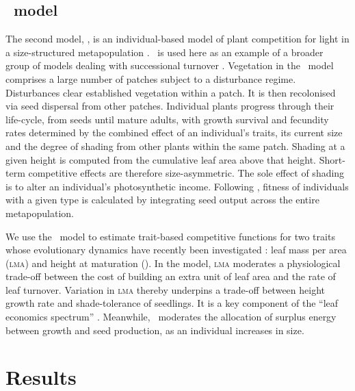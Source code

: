 \documentclass[a4paper,11pt]{article}
\begin{document}
\subsection{\plant\ model}

The second model, \plant, is an individual-based model of plant competition
for light in a size-structured metapopulation \citep{Falster-2016,Falster-2015}. \plant\ is used here as an example of a broader group
of models dealing with successional turnover
\citep{Huston-1987,Kohyama-1993,Moorcroft-2001,Falster-2011}.
%
Vegetation in the \plant\ model comprises a large number of patches subject
to a disturbance regime.  Disturbances clear established
vegetation within a patch. It is then recolonised via seed
dispersal from other patches.  Individual plants progress through
their life-cycle, from seeds until mature adults, with growth survival
and fecundity rates determined by the combined effect of an
individual's traits, its current size and the degree of shading from
other plants within the same patch. Shading at a given
height is computed from the cumulative leaf area above that height.
Short-term competitive effects are therefore size-asymmetric. The sole
effect of shading is to alter an individual's photosynthetic
income. Following \citep{Falster-2015}, fitness of individuals
with a given type is calculated by integrating seed output across the
entire metapopulation.

We use the \plant\ model to estimate trait-based competitive functions
for two traits whose evolutionary dynamics have recently been
investigated \citep{Falster-2015}: leaf mass per area (\textsc{lma})
and height at maturation (\hmat). In the model, \textsc{lma} moderates
a physiological trade-off between the cost of building an extra unit
of leaf area and the rate of leaf turnover.  Variation in \textsc{lma}
thereby underpins a trade-off between height growth rate and
shade-tolerance of seedlings. It is a key component of the
``leaf economics spectrum'' \citep{Wright-2004}. Meanwhile, \hmat\
moderates the allocation of surplus energy between growth and seed
production, as an individual increases in size.

\section{Results}

%
\end{document}
